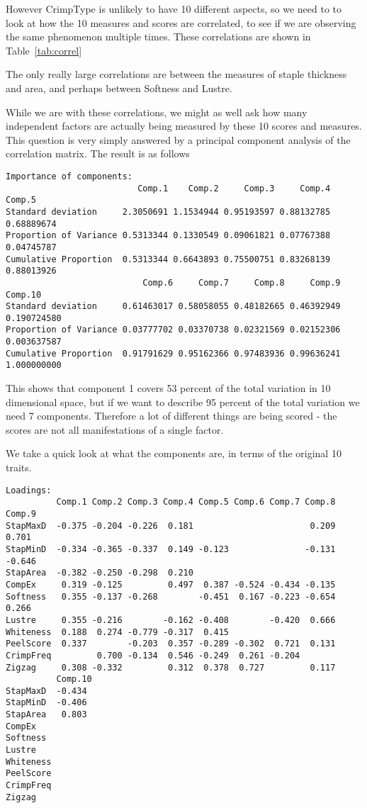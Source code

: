 \documentclass[titlepage]{article}  %
\begin{document}
However CrimpType is unlikely to have 10 different aspects, so we need to to look at how the 10 measures and scores are correlated, to see if we are observing the same phenomenon multiple times. These correlations are shown in Table~\ref{tab:correl}

The only really large correlations are between the measures of staple thickness and area, and perhaps between Softness and Lustre.

While we are with these correlations, we might as well ask how many independent factors are actually being measured by these 10 scores and measures. This question is very simply answered by a principal component analysis of the correlation matrix. The result is as follows
\begin{verbatim}
Importance of components:
                          Comp.1    Comp.2     Comp.3     Comp.4     Comp.5
Standard deviation     2.3050691 1.1534944 0.95193597 0.88132785 0.68889674
Proportion of Variance 0.5313344 0.1330549 0.09061821 0.07767388 0.04745787
Cumulative Proportion  0.5313344 0.6643893 0.75500751 0.83268139 0.88013926
                           Comp.6     Comp.7     Comp.8     Comp.9     Comp.10
Standard deviation     0.61463017 0.58058055 0.48182665 0.46392949 0.190724580
Proportion of Variance 0.03777702 0.03370738 0.02321569 0.02152306 0.003637587
Cumulative Proportion  0.91791629 0.95162366 0.97483936 0.99636241 1.000000000
\end{verbatim}

This shows that component 1 covers 53 percent of the total variation in 10 dimensional space, but if we want to describe 95 percent of the total variation we need 7 components. Therefore a lot of different things are being scored - the scores are not all manifestations of a single factor. 

We take a quick look at what the components are, in terms of the original 10 traits. 
\begin{verbatim}
Loadings:
          Comp.1 Comp.2 Comp.3 Comp.4 Comp.5 Comp.6 Comp.7 Comp.8 Comp.9
StapMaxD  -0.375 -0.204 -0.226  0.181                       0.209  0.701
StapMinD  -0.334 -0.365 -0.337  0.149 -0.123               -0.131 -0.646
StapArea  -0.382 -0.250 -0.298  0.210                                   
CompEx     0.319 -0.125         0.497  0.387 -0.524 -0.434 -0.135       
Softness   0.355 -0.137 -0.268        -0.451  0.167 -0.223 -0.654  0.266
Lustre     0.355 -0.216        -0.162 -0.408        -0.420  0.666       
Whiteness  0.188  0.274 -0.779 -0.317  0.415                            
PeelScore  0.337        -0.203  0.357 -0.289 -0.302  0.721  0.131       
CrimpFreq         0.700 -0.134  0.546 -0.249  0.261 -0.204              
Zigzag     0.308 -0.332         0.312  0.378  0.727         0.117       
          Comp.10
StapMaxD  -0.434 
StapMinD  -0.406 
StapArea   0.803 
CompEx           
Softness         
Lustre           
Whiteness        
PeelScore        
CrimpFreq        
Zigzag           
\end{verbatim}
\end{document}
